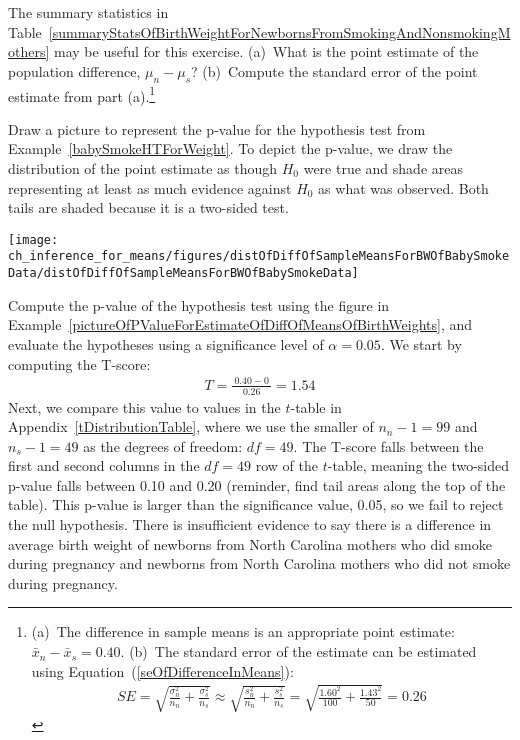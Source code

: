{\begin{exercise}
The summary statistics in Table~\ref{summaryStatsOfBirthWeightForNewbornsFromSmokingAndNonsmokingMothers} may be useful for this exercise. (a)~What is the point estimate of the population difference, $\mu_{n} - \mu_{s}$? (b)~Compute the standard error of the point estimate from part (a).\footnote{(a)~The difference in sample means is an appropriate point estimate: $\bar{x}_{n} - \bar{x}_{s} = 0.40$. (b)~The standard error of the estimate can be estimated using Equation~(\ref{seOfDifferenceInMeans}):
\begin{eqnarray*}
SE = \sqrt{\frac{\sigma_n^2}{n_n} + \frac{\sigma_s^2}{n_s}}
	\approx \sqrt{\frac{s_n^2}{n_n} + \frac{s_s^2}{n_s}}
	= \sqrt{\frac{1.60^2}{100} + \frac{1.43^2}{50}}
	= 0.26
\end{eqnarray*}}
\end{exercise}

\textC{\newpage}

\begin{example}{Draw a picture to represent the p-value for the hypothesis test from Example~\ref{babySmokeHTForWeight}.} \label{pictureOfPValueForEstimateOfDiffOfMeansOfBirthWeights}
To depict the p-value, we draw the distribution of the point estimate as though $H_0$ were true and shade areas representing at least as much evidence against $H_0$ as what was observed. Both tails are shaded because it is a two-sided test.
\begin{center}
\texttt{[image: ch\_inference\_for\_means/figures/distOfDiffOfSampleMeansForBWOfBabySmokeData/distOfDiffOfSampleMeansForBWOfBabySmokeData]}
\end{center}
\end{example}

\begin{example}{Compute the p-value of the hypothesis test using the figure in Example~\ref{pictureOfPValueForEstimateOfDiffOfMeansOfBirthWeights}, and evaluate the hypotheses using a significance level of $\alpha=0.05$.} \label{babySmokeHTForWeightComputePValueAndEvalHT}
We start by computing the T-score:
\begin{eqnarray*}
T = \frac{\ 0.40 - 0\ }{0.26} = 1.54
\end{eqnarray*}
Next, we compare this value to values in the $t$-table in Appendix~\vref{tDistributionTable}, where we use the smaller of $n_n - 1 = 99$ and $n_s - 1 = 49$ as the degrees of freedom: $df = 49$. The T-score falls between the first and second columns in the $df = 49$ row of the $t$-table, meaning the two-sided p-value falls between 0.10 and 0.20 (reminder, find tail areas along the top of the table). This p-value is larger than the significance value, 0.05, so we fail to reject the null hypothesis. There is insufficient evidence to say there is a difference in average birth weight of newborns from North Carolina mothers who did smoke during pregnancy and newborns from North Carolina mothers who did not smoke during pregnancy.
\end{example}

}

